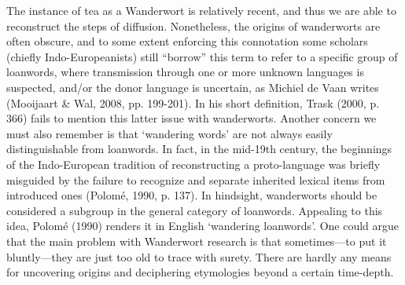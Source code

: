 The instance of tea as a Wanderwort is relatively recent, and thus we are able to reconstruct the steps of diffusion. Nonetheless, the origins of \glspl{wanderwort} are often obscure, and to some extent enforcing this connotation some scholars (chiefly Indo-Europeanists) still ``borrow'' this term to refer to a specific group of loanwords, where transmission through one or more unknown languages is suspected, and/or the donor language is uncertain, as Michiel de Vaan writes (Mooijaart \& Wal, 2008, pp. 199-201). In his short definition, Trask (2000, p. 366) fails to mention this latter issue with \glspl{wanderwort}. Another concern we must also remember is that `wandering words' are not always easily distinguishable from loanwords. In fact, in the mid-19th century, the beginnings of the Indo-European tradition of reconstructing a proto-language was briefly misguided by the failure to recognize and separate inherited lexical items from introduced ones (Polomé, 1990, p. 137). In hindsight, \glspl{wanderwort} should be considered a subgroup in the general category of loanwords. Appealing to this idea, Polomé (1990) renders it in English `wandering loanwords'. One could argue that the main problem with Wanderwort research is that sometimes---to put it bluntly---they are just too old to trace with surety. There are hardly any means for uncovering origins and deciphering etymologies beyond a certain time-depth. 




